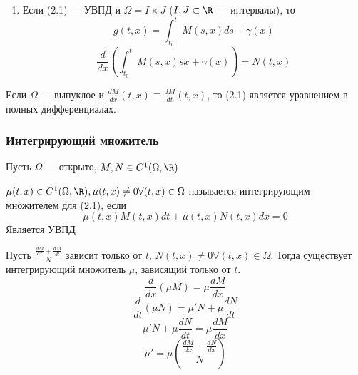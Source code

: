 \begin{enumerate}
    \item Если (2.1) --- УВПД и \(\Omega = I \times J\) (\(I, J \subset \R\) --- интервалы), то
    \[g(t, x) = \int_{t_0}^t M(s, x)ds + \gamma(x)\]
    \[\frac{d}{dx}\left(\int_{t_0}^t M(s, x)sx + \gamma(x)\right) = N(t, x)\]
\end{enumerate}

\begin{theorem}
    Если \(\Omega\) --- выпуклое и \(\frac{dM}{dx}(t, x) \equiv \frac{dM}{dt}(t, x)\), то (2.1) является уравнением в полных дифференциалах.
\end{theorem}

\subsubsection{Интегрирующий множитель}
Пусть \(\Omega\) --- открыто, \(M, N \in C^1(\Omega, \R)\)
\begin{definition}
    \(\mu(t, x) \in C^1(\Omega, \R), \mu(t, x) \ne 0 \forall (t, x) \in \Omega\) называется интегрирующим множителем для (2.1), если 
    \[\mu(t, x)M(t, x)dt + \mu(t, x)N(t, x)dx = 0\]
    Является УВПД
\end{definition}

\begin{proposition}
    Пусть \(\frac{\frac{dM}{dx} + \frac{dM}{dt}}{N}\) зависит только от \(t\), \(N(t, x) \ne 0 \forall (t, x) \in \Omega\). Тогда существует интегрирующий множитель \(\mu\), зависящий только от \(t\).
    \[\frac{d}{dx}(\mu M) = \mu \frac{dM}{dx}\]
    \[\frac{d}{dt}(\mu N) = \mu' N + \mu \frac{dN}{dt}\]
    \[\mu'N + \mu \frac{dN}{dt} = \mu \frac{dM}{dx}\]
    \[\mu' = \mu\left(\frac{\frac{dM}{dx} - \frac{dN}{dx}}{N}\right)\]
\end{proposition}
